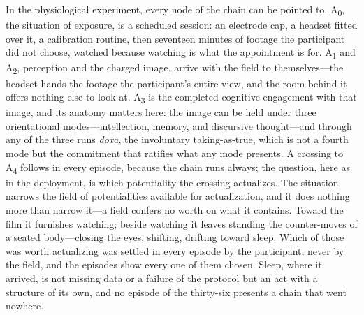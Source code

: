In the physiological experiment, every node of the chain can be pointed to. A\textsubscript{0}, the situation
of exposure, is a scheduled session: an electrode cap, a headset fitted over it, a calibration
routine, then seventeen minutes of footage the participant did not choose, watched because
watching is what the appointment is for. A\textsubscript{1} and A\textsubscript{2}, perception
and the charged image, arrive with the field to themselves---the headset hands the footage the
participant's entire view, and the room behind it offers nothing else to look at.
A\textsubscript{3} is the completed cognitive engagement with that image, and its anatomy
matters here: the image can be held under three orientational modes---intellection, memory, and
discursive thought---and through any of the three runs \textit{doxa}, the involuntary
taking-as-true, which is not a fourth mode but the commitment that ratifies what any mode
presents. A crossing to A\textsubscript{4} follows in
every episode, because the chain runs always; the question, here as in the deployment, is which
potentiality the crossing actualizes. The situation narrows the field of potentialities
available for actualization, and it does nothing more than narrow it---a field confers no worth
on what it contains. Toward the film it furnishes watching; beside watching it leaves standing
the counter-moves of a seated body---closing the eyes, shifting, drifting toward sleep. Which
of those was worth actualizing was settled in every episode by the participant, never by the
field, and the episodes show every one of them chosen. Sleep, where it arrived, is not missing
data or a failure of the protocol but an act with a structure of its own, and no episode of the
thirty-six presents a chain that went nowhere.

